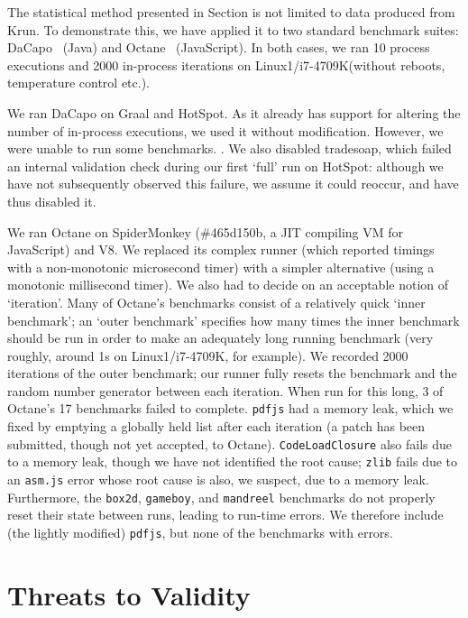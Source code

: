\documentclass[preprint,numbers,10pt]{sigplanconf}
\newcommand{\bencherthree}{Linux1/i7-4709K\xspace}
\begin{document}
The statistical method presented in Section  is not limited to data
produced from Krun. To demonstrate this, we have applied it to two standard
benchmark suites: DaCapo~\cite{dacapo06} (Java) and Octane~
(JavaScript). In both cases, we ran 10 process executions and 2000 in-process
iterations on \bencherthree (without reboots, temperature control etc.).

We ran DaCapo on Graal and HotSpot. As it already has support for
altering the number of in-process executions, we used it without modification.
However, we were unable to run some benchmarks. . We also disabled tradesoap, which
failed an internal validation check during our first `full' run on HotSpot:
although we have not subsequently observed this failure, we assume it could
reoccur, and have thus disabled it.

We ran Octane on SpiderMonkey (\#465d150b, a JIT compiling VM for JavaScript) and V8. 
We replaced its complex runner (which reported timings with a non-monotonic
microsecond timer) with a simpler alternative (using a monotonic millisecond
timer). We also had to decide on an acceptable notion of `iteration'. Many of Octane's
benchmarks consist of a relatively quick `inner benchmark'; an `outer benchmark'
specifies how many times the inner benchmark should be run in order to make an
adequately long running benchmark (very roughly, around 1s on \bencherthree, for
example). We recorded 2000 iterations of the outer benchmark; our runner
fully resets the benchmark and the random number generator between each
iteration. When run for this long, 3 of
Octane's 17 benchmarks failed to complete. \texttt{pdfjs} had a memory leak,
which we fixed by emptying a globally held list after each iteration
(a patch has been submitted, though
not yet accepted, to Octane). \texttt{CodeLoadClosure} also
fails due to a memory leak, though we have not identified the root cause;
\texttt{zlib} fails due to an \texttt{asm.js} error whose root cause is also, we
suspect, due to a memory leak. Furthermore, the \texttt{box2d},
\texttt{gameboy}, and \texttt{mandreel} benchmarks do not properly reset their
state between runs, leading to run-time errors. We therefore include (the
lightly modified) \texttt{pdfjs}, but none of the benchmarks with errors.


\section{Threats to Validity}
\label{sec:threats}
\end{document}
